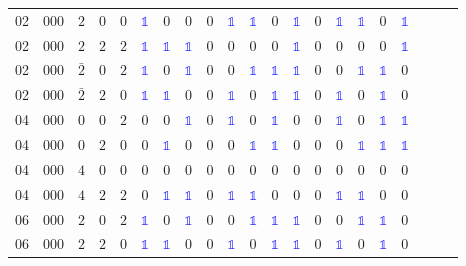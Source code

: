 \begin{longtable*}{c| cccccccccccccccccccc }
02& 000& $2$& $0$& $0$& \textcolor{blue}{$\mathds{1}$}& 0& 0& 0& \textcolor{blue}{$\mathds{1}$}& \textcolor{blue}{$\mathds{1}$}& 0& \textcolor{blue}{$\mathds{1}$}& 0& \textcolor{blue}{$\mathds{1}$}& \textcolor{blue}{$\mathds{1}$}& 0& \textcolor{blue}{$\mathds{1}$}\\
02& 000& $2$& $2$& $2$& \textcolor{blue}{$\mathds{1}$}& \textcolor{blue}{$\mathds{1}$}& \textcolor{blue}{$\mathds{1}$}& 0& 0& 0& 0& \textcolor{blue}{$\mathds{1}$}& 0& 0& 0& 0& \textcolor{blue}{$\mathds{1}$}\\
02& 000& $\bar{2}$& $0$& $2$& \textcolor{blue}{$\mathds{1}$}& 0& \textcolor{blue}{$\mathds{1}$}& 0& 0& \textcolor{blue}{$\mathds{1}$}& \textcolor{blue}{$\mathds{1}$}& \textcolor{blue}{$\mathds{1}$}& 0& 0& \textcolor{blue}{$\mathds{1}$}& \textcolor{blue}{$\mathds{1}$}& 0\\
02& 000& $\bar{2}$& $2$& $0$& \textcolor{blue}{$\mathds{1}$}& \textcolor{blue}{$\mathds{1}$}& 0& 0& \textcolor{blue}{$\mathds{1}$}& 0& \textcolor{blue}{$\mathds{1}$}& \textcolor{blue}{$\mathds{1}$}& 0& \textcolor{blue}{$\mathds{1}$}& 0& \textcolor{blue}{$\mathds{1}$}& 0\\
04& 000& $0$& $0$& $2$& 0& 0& \textcolor{blue}{$\mathds{1}$}& 0& \textcolor{blue}{$\mathds{1}$}& 0& \textcolor{blue}{$\mathds{1}$}& 0& 0& \textcolor{blue}{$\mathds{1}$}& 0& \textcolor{blue}{$\mathds{1}$}& \textcolor{blue}{$\mathds{1}$}\\
04& 000& $0$& $2$& $0$& 0& \textcolor{blue}{$\mathds{1}$}& 0& 0& 0& \textcolor{blue}{$\mathds{1}$}& \textcolor{blue}{$\mathds{1}$}& 0& 0& 0& \textcolor{blue}{$\mathds{1}$}& \textcolor{blue}{$\mathds{1}$}& \textcolor{blue}{$\mathds{1}$}\\
04& 000& $4$& $0$& $0$& 0& 0& 0& 0& 0& 0& 0& 0& 0& 0& 0& 0& 0\\
04& 000& $4$& $2$& $2$& 0& \textcolor{blue}{$\mathds{1}$}& \textcolor{blue}{$\mathds{1}$}& 0& \textcolor{blue}{$\mathds{1}$}& \textcolor{blue}{$\mathds{1}$}& 0& 0& 0& \textcolor{blue}{$\mathds{1}$}& \textcolor{blue}{$\mathds{1}$}& 0& 0\\
06& 000& $2$& $0$& $2$& \textcolor{blue}{$\mathds{1}$}& 0& \textcolor{blue}{$\mathds{1}$}& 0& 0& \textcolor{blue}{$\mathds{1}$}& \textcolor{blue}{$\mathds{1}$}& \textcolor{blue}{$\mathds{1}$}& 0& 0& \textcolor{blue}{$\mathds{1}$}& \textcolor{blue}{$\mathds{1}$}& 0\\
06& 000& $2$& $2$& $0$& \textcolor{blue}{$\mathds{1}$}& \textcolor{blue}{$\mathds{1}$}& 0& 0& \textcolor{blue}{$\mathds{1}$}& 0& \textcolor{blue}{$\mathds{1}$}& \textcolor{blue}{$\mathds{1}$}& 0& \textcolor{blue}{$\mathds{1}$}& 0& \textcolor{blue}{$\mathds{1}$}& 0\\

\end{longtable*}
